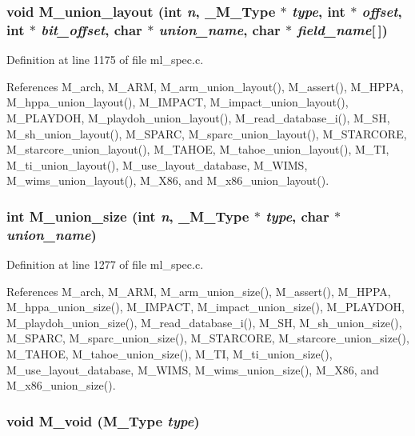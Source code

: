 \subsubsection{\setlength{\rightskip}{0pt plus 5cm}void M\_\-union\_\-layout (int {\em n}, \bf{\_\-M\_\-Type} $\ast$ {\em type}, int $\ast$ {\em offset}, int $\ast$ {\em bit\_\-offset}, char $\ast$ {\em union\_\-name}, char $\ast$ {\em field\_\-name}[$\,$])}\label{ml__spec_8c_f481657f2f39a167022d6db00bb5a5f5}




Definition at line 1175 of file ml\_\-spec.c.

References M\_\-arch, M\_\-ARM, M\_\-arm\_\-union\_\-layout(), M\_\-assert(), M\_\-HPPA, M\_\-hppa\_\-union\_\-layout(), M\_\-IMPACT, M\_\-impact\_\-union\_\-layout(), M\_\-PLAYDOH, M\_\-playdoh\_\-union\_\-layout(), M\_\-read\_\-database\_\-i(), M\_\-SH, M\_\-sh\_\-union\_\-layout(), M\_\-SPARC, M\_\-sparc\_\-union\_\-layout(), M\_\-STARCORE, M\_\-starcore\_\-union\_\-layout(), M\_\-TAHOE, M\_\-tahoe\_\-union\_\-layout(), M\_\-TI, M\_\-ti\_\-union\_\-layout(), M\_\-use\_\-layout\_\-database, M\_\-WIMS, M\_\-wims\_\-union\_\-layout(), M\_\-X86, and M\_\-x86\_\-union\_\-layout().
\subsubsection{\setlength{\rightskip}{0pt plus 5cm}int M\_\-union\_\-size (int {\em n}, \bf{\_\-M\_\-Type} $\ast$ {\em type}, char $\ast$ {\em union\_\-name})}\label{ml__spec_8c_9afb7743715935be6c9dcd628a03408b}




Definition at line 1277 of file ml\_\-spec.c.

References M\_\-arch, M\_\-ARM, M\_\-arm\_\-union\_\-size(), M\_\-assert(), M\_\-HPPA, M\_\-hppa\_\-union\_\-size(), M\_\-IMPACT, M\_\-impact\_\-union\_\-size(), M\_\-PLAYDOH, M\_\-playdoh\_\-union\_\-size(), M\_\-read\_\-database\_\-i(), M\_\-SH, M\_\-sh\_\-union\_\-size(), M\_\-SPARC, M\_\-sparc\_\-union\_\-size(), M\_\-STARCORE, M\_\-starcore\_\-union\_\-size(), M\_\-TAHOE, M\_\-tahoe\_\-union\_\-size(), M\_\-TI, M\_\-ti\_\-union\_\-size(), M\_\-use\_\-layout\_\-database, M\_\-WIMS, M\_\-wims\_\-union\_\-size(), M\_\-X86, and M\_\-x86\_\-union\_\-size().
\subsubsection{\setlength{\rightskip}{0pt plus 5cm}void M\_\-void (\bf{M\_\-Type} {\em type})}\label{ml__spec_8c_194c266d106dcf3ee22ed66fb67b4b06}




